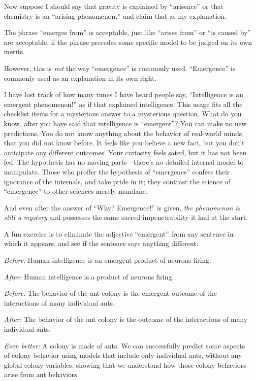 {
 Now suppose I should say that gravity is explained by
``arisence'' or that chemistry is an
``arising phenomenon,'' and claim
that as my explanation.}

{
 The phrase ``emerges from'' is
acceptable, just like ``arises
from'' or ``is caused
by'' are acceptable, if the phrase precedes some
specific model to be judged on its own merits.}

{
 However, this is \textit{not} the way
``emergence'' is commonly used.
``Emergence'' is commonly used as an
explanation in its own right.}

{
 I have lost track of how many times I have heard people say,
``Intelligence is an emergent
phenomenon!'' as if that explained intelligence. This
usage fits all the checklist items for a mysterious answer to a
mysterious question. What do you know, after you have said that
intelligence is ``emergent''? You
can make no new predictions. You do not know anything about the
behavior of real-world minds that you did not know before. It feels
like you believe a new fact, but you don't anticipate
any different outcomes. Your curiosity feels sated, but it has not been
fed. The hypothesis has no moving parts---there's no
detailed internal model to manipulate. Those who proffer the hypothesis
of ``emergence'' confess their
ignorance of the internals, and take pride in it; they contrast the
science of ``emergence'' to other
sciences merely mundane.}

{
 And even after the answer of ``Why?
Emergence!'' is given, \textit{the phenomenon is
still a mystery} and possesses the same sacred impenetrability it had
at the start.}

{
 A fun exercise is to eliminate the adjective
``emergent'' from any sentence in
which it appears, and see if the sentence says anything different:}

{
 \textit{Before:} Human intelligence is an emergent product of
neurons firing.}

{
 \textit{After:} Human intelligence is a product of neurons
firing.}

{
 \textit{Before:} The behavior of the ant colony is the emergent
outcome of the interactions of many individual ants.}

{
 \textit{After:} The behavior of the ant colony is the outcome of
the interactions of many individual ants.}

{
 \textit{Even better:} A colony is made of ants. We can
successfully predict some aspects of colony behavior using models that
include only individual ants, without any global colony variables,
showing that we understand how those colony behaviors arise from ant
behaviors.}

